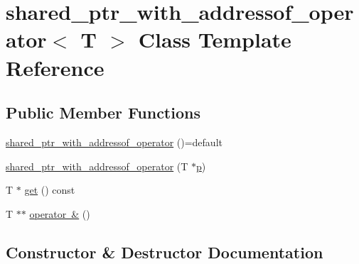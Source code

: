\hypertarget{classshared__ptr__with__addressof__operator}{}\section{shared\+\_\+ptr\+\_\+with\+\_\+addressof\+\_\+operator$<$ T $>$ Class Template Reference}
\label{classshared__ptr__with__addressof__operator}
\subsection*{Public Member Functions}
\begin{DoxyCompactItemize}
\item 
\mbox{\hyperlink{classshared__ptr__with__addressof__operator_adb47c3e10d570b263cdeae4df019853e}{shared\+\_\+ptr\+\_\+with\+\_\+addressof\+\_\+operator}} ()=default
\item 
\mbox{\hyperlink{classshared__ptr__with__addressof__operator_a2f78d3343f1a00d17bb393dad8382cf6}{shared\+\_\+ptr\+\_\+with\+\_\+addressof\+\_\+operator}} (T $\ast$\mbox{\hyperlink{_s_d_l__opengl__glext_8h_aa5367c14d90f462230c2611b81b41d23}{p}})
\item 
T $\ast$ \mbox{\hyperlink{classshared__ptr__with__addressof__operator_a68e7386545e7d9e52af937a7451b724d}{get}} () const
\item 
T $\ast$$\ast$ \mbox{\hyperlink{classshared__ptr__with__addressof__operator_aa3b91ada8c525714cf935d261dd44712}{operator \&}} ()
\end{DoxyCompactItemize}


\subsection{Constructor \& Destructor Documentation}
\mbox{\label{classshared__ptr__with__addressof__operator_adb47c3e10d570b263cdeae4df019853e}} 
